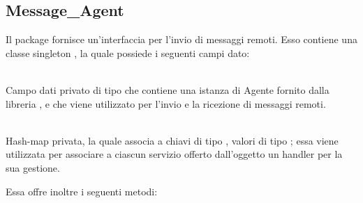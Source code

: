 	\subsection{Message\_Agent}
	
	Il package  fornisce un'interfaccia per l'invio di messaggi remoti. Esso contiene una classe singleton , la quale possiede i seguenti campi dato:
	\begin{description}
		\item {} \\
		Campo dati privato di tipo  che contiene una istanza di Agente fornito dalla libreria , e che viene utilizzato per l'invio e la ricezione di messaggi remoti.
		\item {} \\
		Hash-map privata, la quale associa a chiavi di tipo , valori di tipo ; essa viene utilizzata per associare a ciascun servizio offerto dall'oggetto  un handler per la sua gestione.
	\end{description}
	
	Essa offre inoltre i seguenti metodi:
	
